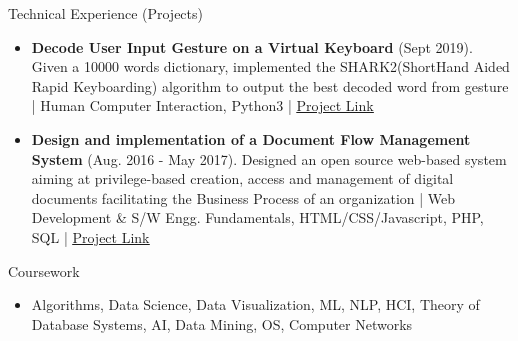 \documentclass[]{mcdowellcv}
\begin{document}
\begin{cvsection}{Technical Experience (Projects)}
		\begin{cvsubsection}{}{}{}
			\begin{itemize}
				
				\item \textbf{Decode User Input Gesture on a Virtual Keyboard} (Sept 2019). Given a 10000 words dictionary, implemented the SHARK2(ShortHand Aided Rapid Keyboarding) algorithm to output the best decoded word from gesture | Human Computer Interaction, Python3 |  \underline{\href{https://github.com/Trisha11r/Decode_Gesture_SHARK2_algo}{Project Link}}
			\end{itemize}
		\end{cvsubsection}
				
		\begin{cvsubsection}{}{}{}
		    \begin{itemize}
				
				\item \textbf{Design and implementation of a Document Flow Management System} (Aug. 2016 - May 2017). Designed an open source web-based system aiming at privilege-based creation, access and management of digital documents facilitating the Business Process of an organization | Web Development \& S/W Engg. Fundamentals, HTML/CSS/Javascript, PHP, SQL |  \underline{\href{https://github.com/Trisha11r/Document-Flow-Management-System}{Project Link}}
			\end{itemize}
		\end{cvsubsection}
		
	\end{cvsection}
	
	\begin{cvsection}{Coursework}
		\begin{cvsubsection}{}{}{}	
			\begin{itemize}
				\item Algorithms, Data Science, Data Visualization, ML, NLP, HCI, Theory of Database Systems, AI, Data Mining, OS, Computer Networks
				
			\end{itemize}
		\end{cvsubsection}
	\end{cvsection}
	
\end{document}
